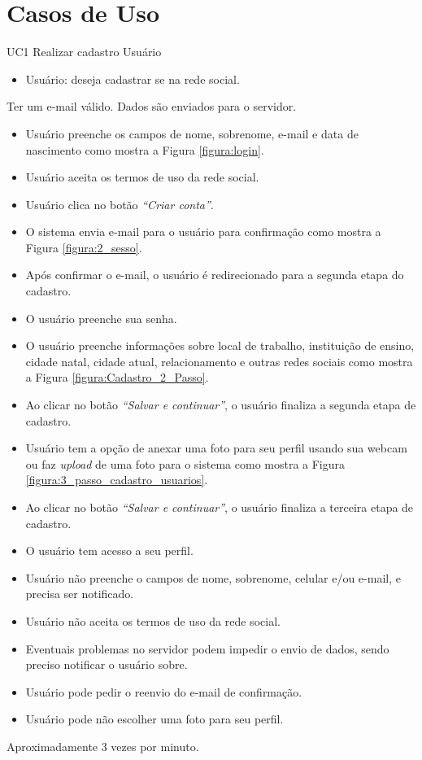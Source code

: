 \chapter{Casos de Uso}

\casoDeUso
{UC1}
{Realizar cadastro}
{Usuário}
{
\begin{itemize}
	\item Usuário: deseja cadastrar se na rede social.	
\end{itemize}

}
{Ter um e-mail válido.}
{Dados são enviados para o servidor.}
{
\begin{itemize}
	\item Usuário preenche os campos de nome, sobrenome, e-mail e data de nascimento como mostra a Figura  \ref{figura:login}. %
	\item Usuário aceita os termos de uso da rede social.		
	\item Usuário clica no botão \textit{“Criar conta”}.	
	\item O sistema envia e-mail para o usuário para confirmação como mostra a Figura \ref{figura:2_sesso}.
	\item Após confirmar o e-mail, o usuário é redirecionado para a segunda etapa do cadastro.		
	\item O usuário preenche sua senha.
	\item O usuário preenche informações sobre local de trabalho, instituição de ensino, cidade natal, cidade atual, relacionamento e outras redes sociais como mostra a Figura \ref{figura:Cadastro_2_Passo}.
	\item Ao clicar no botão \textit{“Salvar e continuar”}, o usuário finaliza a segunda etapa de cadastro.	
	\item Usuário tem a opção de anexar uma foto para seu perfil usando sua webcam ou faz \textit{upload} de uma foto para o sistema como mostra a Figura \ref{figura:3_passo_cadastro_usuarios}. %
	\item Ao clicar no botão \textit{“Salvar e continuar”}, o usuário finaliza a terceira etapa de cadastro.
	\item O usuário tem acesso a seu perfil.	
	
			
\end{itemize}
}
{
\begin{itemize}
	\item Usuário não preenche o campos de nome, sobrenome, celular e/ou e-mail, e precisa ser notificado.
	\item Usuário não aceita os termos de uso da rede social.
	\item Eventuais problemas no servidor podem impedir o envio de dados, sendo preciso notificar o usuário sobre.
	\item Usuário pode pedir o reenvio do e-mail de confirmação.
	\item Usuário pode não escolher uma foto para seu perfil.
	
\end{itemize}
}
{Aproximadamente 3 vezes por minuto.}
{

}

